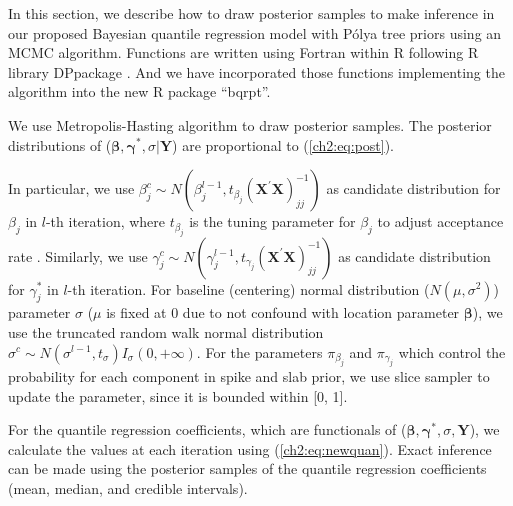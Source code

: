 \documentclass[12pt]{article}
\newcommand{\polya}{P\'{o}lya}
\begin{document}
In this section, we describe how to draw posterior samples to make
inference in our proposed Bayesian quantile regression model with
\polya{} tree priors using an MCMC algorithm. Functions are written
using Fortran within R \citep{R} following R library
DPpackage \citep{DPpackage}. And we have incorporated those
functions implementing the algorithm into the new R \citep{R} package
``bqrpt''.

We use Metropolis-Hasting algorithm to draw posterior samples.
The posterior distributions of ($\bm \beta, \bm \gamma^{*}, \sigma| \bm Y$) are proportional to (\ref{ch2:eq:post}).

In particular, we use $\beta_j^c \sim N(\beta_j^{l-1}, t_{\beta_j} (\bm{X}^{\prime}\bm X)^{-1}_{jj})$ as candidate distribution for $\beta_j$ in $l$-th iteration,
where $t_{\beta_j}$ is the tuning parameter for $\beta_j$ to adjust acceptance rate \citep{jara2009}.
Similarly, we use $\gamma_j^c \sim N(\gamma_j^{l-1}, t_{\gamma_j}(\bm{X}^{\prime}\bm X)^{-1}_{jj})$ as candidate distribution for $\gamma_j^{*}$ in $l$-th iteration.
For baseline (centering) normal distribution ($N(\mu, \sigma^2)$) parameter $\sigma$ ($\mu$ is fixed at 0 due to not confound with location parameter $\bm \beta$),
we use the truncated random walk normal distribution $\sigma^c \sim N(\sigma^{l-1}, t_{\sigma}) I_{\sigma}(0, +\infty)$.
For the parameters $\pi_{\beta_j}$ and $\pi_{\gamma_j}$ which control the probability for each component in spike and slab prior,
we use slice sampler to update the parameter, since it is bounded within [0, 1].



For the quantile regression coefficients, which are functionals of ($\bm \beta, \bm \gamma^{*}, \sigma, \bm Y$),
we calculate the values at each iteration using (\ref{ch2:eq:newquan}).
Exact inference can be made using the posterior samples of the quantile regression coefficients (mean, median, and credible intervals).
\end{document}
